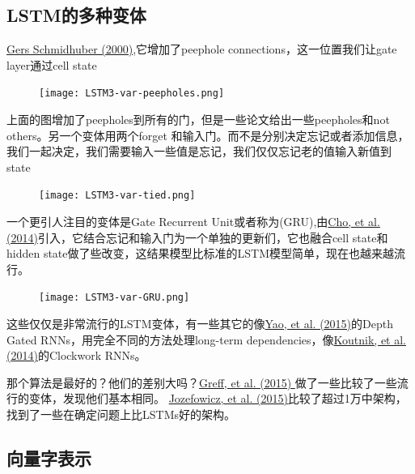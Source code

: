 \subsection{LSTM的多种变体}
\href{ftp://ftp.idsia.ch/pub/juergen/TimeCount-IJCNN2000.pdf}{Gers  Schmidhuber (2000)},它增加了peephole connections，这一位置我们让gate layer通过cell state
\begin{figure}
\centering
\texttt{[image: LSTM3-var-peepholes.png]}
\end{figure}
上面的图增加了peepholes到所有的门，但是一些论文给出一些peepholes和not others。另一个变体用两个forget 和输入门。而不是分别决定忘记或者添加信息，我们一起决定，我们需要输入一些值是忘记，我们仅仅忘记老的值输入新值到state
\begin{figure}
\centering
\texttt{[image: LSTM3-var-tied.png]}
\end{figure}
一个更引人注目的变体是Gate Recurrent Unit或者称为(GRU),由\href{http://arxiv.org/pdf/1406.1078v3.pdf}{Cho, et al. (2014)}引入，它结合忘记和输入门为一个单独的更新们，它也融合cell state和hidden state做了些改变，这结果模型比标准的LSTM模型简单，现在也越来越流行。
\begin{figure}
\centering
\texttt{[image: LSTM3-var-GRU.png]}
\end{figure}
这些仅仅是非常流行的LSTM变体，有一些其它的像\href{http://arxiv.org/pdf/1508.03790v2.pdf}{Yao, et al. (2015)}的Depth Gated RNNs，用完全不同的方法处理long-term dependencies，像\href{http://arxiv.org/pdf/1402.3511v1.pdf}{Koutnik, et al. (2014)}的Clockwork RNNs。\par
那个算法是最好的？他们的差别大吗？\href{http://arxiv.org/pdf/1503.04069.pdf}{Greff, et al. (2015) }做了一些比较了一些流行的变体，发现他们基本相同。
\href{http://jmlr.org/proceedings/papers/v37/jozefowicz15.pdf}{Jozefowicz, et al. (2015)}比较了超过1万中架构，找到了一些在确定问题上比LSTMs好的架构。
\subsection{向量字表示}

